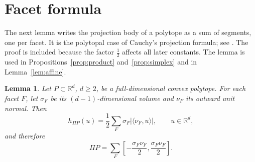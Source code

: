 \documentclass[11pt]{article}
\newtheorem{lemma}[theorem]{Lemma}
\newcommand{\R}{\mathbb R}
\begin{document}
\section{Facet formula}\label{sec:facets}

The next lemma writes the projection body of a polytope as a sum of
segments, one per facet. It is the polytopal case of Cauchy's projection
formula; see \cite[Section~1]{Saroglou}. The proof is included because the
factor \(\tfrac12\) affects all later constants. The lemma is used in
Propositions~\ref{prop:product} and~\ref{prop:simplex} and in
Lemma~\ref{lem:affine}.

\begin{lemma}\label{lem:facets}
Let \(P\subset\R^d\), \(d\ge2\), be a full-dimensional convex polytope. For
each facet \(F\), let \(\sigma_F\) be its \((d-1)\)-dimensional volume and
\(\nu_F\) its outward unit normal. Then
\begin{equation}\label{eq:facet}
 h_{\Pi P}(u)=\frac12\sum_F\sigma_F|\langle\nu_F,u\rangle|,
 \qquad u\in\R^d,
\end{equation}
and therefore
\begin{equation}\label{eq:zonotope}
 \Pi P=\sum_F
 \left[-\frac{\sigma_F\nu_F}{2},\frac{\sigma_F\nu_F}{2}\right].
\end{equation}
\end{lemma}
\end{document}
